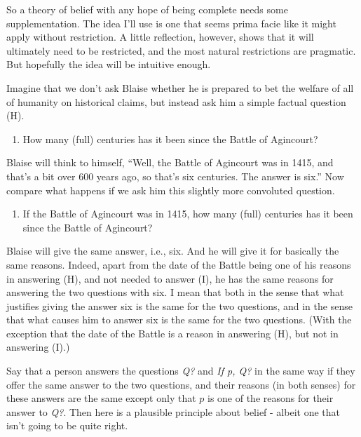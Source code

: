 \documentclass[11pt,]{book}
\providecommand{\tightlist}{%
  \setlength{\itemsep}{0pt}\setlength{\parskip}{0pt}}
\begin{document}
So a theory of belief with any hope of being complete needs some supplementation. The idea I'll use is one that seems prima facie like it might apply without restriction. A little reflection, however, shows that it will ultimately need to be restricted, and the most natural restrictions are pragmatic. But hopefully the idea will be intuitive enough.

Imagine that we don't ask Blaise whether he is prepared to bet the welfare of all of humanity on historical claims, but instead ask him a simple factual question (H).

\begin{enumerate}
\def\labelenumi{(\Alph{enumi})}
\setcounter{enumi}{7}
\tightlist
\item
  How many (full) centuries has it been since the Battle of Agincourt?
\end{enumerate}

Blaise will think to himself, ``Well, the Battle of Agincourt was in 1415, and that's a bit over 600 years ago, so that's six centuries. The answer is six.'' Now compare what happens if we ask him this slightly more convoluted question.

\begin{enumerate}
\def\labelenumi{(\Roman{enumi})}
\tightlist
\item
  If the Battle of Agincourt was in 1415, how many (full) centuries has it been since the Battle of Agincourt?
\end{enumerate}

Blaise will give the same answer, i.e., six. And he will give it for basically the same reasons. Indeed, apart from the date of the Battle being one of his reasons in answering (H), and not needed to answer (I), he has the same reasons for answering the two questions with six. I mean that both in the sense that what justifies giving the answer six is the same for the two questions, and in the sense that what causes him to answer six is the same for the two questions. (With the exception that the date of the Battle is a reason in answering (H), but not in answering (I).)

Say that a person answers the questions \emph{Q?} and \emph{If p, Q?} in the same way if they offer the same answer to the two questions, and their reasons (in both senses) for these answers are the same except only that \(p\) is one of the reasons for their answer to \emph{Q?}. Then here is a plausible principle about belief - albeit one that isn't going to be quite right.
\end{document}
